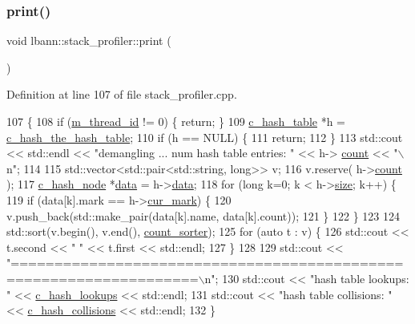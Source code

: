 \subsubsection{\texorpdfstring{print()}{print()}}
{\footnotesize\ttfamily void lbann\+::stack\+\_\+profiler\+::print (\begin{DoxyParamCaption}{ }\end{DoxyParamCaption})}



Definition at line 107 of file stack\+\_\+profiler.\+cpp.


\begin{DoxyCode}
107                            \{
108   \textcolor{keywordflow}{if} (\hyperlink{classlbann_1_1stack__profiler_a1bd742927294507fe67184cb4f47b86c}{m\_thread\_id} != 0) \{ \textcolor{keywordflow}{return}; \}
109   \hyperlink{structc__hash__table}{c\_hash\_table} *h = \hyperlink{stack__profiler_8cpp_acaf4dd8f3a0755b44949a87760cd1102}{c\_hash\_the\_hash\_table};
110   \textcolor{keywordflow}{if} (h == NULL) \{
111     \textcolor{keywordflow}{return};
112   \}
113   std::cout << std::endl << \textcolor{stringliteral}{"demangling ... num hash table entries: "} << h->
      \hyperlink{structc__hash__table_ae4c33f323d44301e5990ba3355a2d708}{count} << \textcolor{stringliteral}{"\(\backslash\)n"};
114 
115   std::vector<std::pair<std::string, long>> v;
116   v.reserve( h->\hyperlink{structc__hash__table_ae4c33f323d44301e5990ba3355a2d708}{count} );
117   \hyperlink{structc__hash__node}{c\_hash\_node} *\hyperlink{namespacelbann_1_1cnpy__utils_a9ac86d96ccb1f8b4b2ea16441738781f}{data} = h->\hyperlink{structc__hash__table_abfdd282e54441552086f78d30b959d60}{data};
118   \textcolor{keywordflow}{for} (\textcolor{keywordtype}{long} k=0; k < h->\hyperlink{structc__hash__table_afd5bfd9640fc5b72f75457fb7dd89663}{size}; k++) \{
119     \textcolor{keywordflow}{if} (data[k].mark == h->\hyperlink{structc__hash__table_a87debaad1679b5fd28537908174a7487}{cur\_mark}) \{
120       v.push\_back(std::make\_pair(data[k].name, data[k].count));
121     \}
122   \}
123 
124   std::sort(v.begin(), v.end(), \hyperlink{namespacelbann_aedcfce41af2eae595ce58b1180f66bd1}{count\_sorter});
125   \textcolor{keywordflow}{for} (\textcolor{keyword}{auto} t : v) \{
126     std::cout << t.second << \textcolor{stringliteral}{"  "} << t.first << std::endl;
127   \}
128 
129   std::cout << \textcolor{stringliteral}{"===================================================================\(\backslash\)n"};
130   std::cout << \textcolor{stringliteral}{"hash table lookups:    "} << \hyperlink{stack__profiler_8cpp_a60ca1ac997785ebd8547c022d07fe4b5}{c\_hash\_lookups} << std::endl;
131   std::cout << \textcolor{stringliteral}{"hash table collisions: "} << \hyperlink{stack__profiler_8cpp_a9e4c390c04f233e99f7577a1c63be028}{c\_hash\_collisions} << std::endl;
132 \}
\end{DoxyCode}
